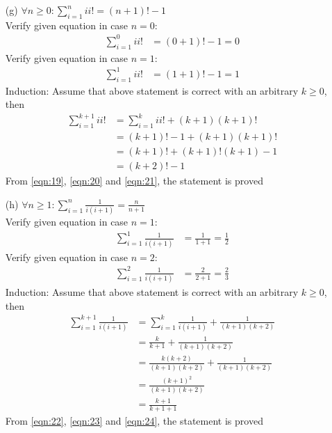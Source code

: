 \begin{enumerate}
    \newpage
    \item[(g)] $\forall n\geq 0: \displaystyle\sum^{n}_{i=1} ii! = (n+1)!-1$ \\
        Verify given equation in case $n=0$:
            \begin{align}
                \displaystyle\sum^{0}_{i=1} ii! &= (0+1)!-1 = 0 \label{eqn:19}
            \end{align}
        Verify given equation in case $n=1$:
            \begin{align}
                \displaystyle\sum^{1}_{i=1} ii! &= (1+1)!-1 = 1 \label{eqn:20}
            \end{align}
        Induction: Assume that above statement is correct with an arbitrary $k \geq 0$, then\\
        \begin{align}
            \displaystyle\sum^{k+1}_{i=1} ii! &= \displaystyle\sum^{k}_{i=1} ii! + (k+1)(k+1)! \\
                                            &= (k+1)!-1 + (k+1)(k+1)! \\
                                            &= (k+1)! + (k+1)!(k+1) -1 \\
                                            &= (k+2)! - 1 \label{eqn:21}
        \end{align}
        From \ref{eqn:19}, \ref{eqn:20} and \ref{eqn:21}, the statement is proved
    
    \item[(h)] $\forall n\geq 1: \displaystyle\sum^{n}_{i=1} \frac{1}{i(i+1)} = \frac{n}{n+1}$ \\
    Verify given equation in case $n=1$:
        \begin{align}
            \displaystyle\sum^{1}_{i=1} \frac{1}{i(i+1)} &= \frac{1}{1+1} = \frac{1}{2} \label{eqn:23}
        \end{align}
    Verify given equation in case $n=2$:
        \begin{align}
            \displaystyle\sum^{2}_{i=1} \frac{1}{i(i+1)} &= \frac{2}{2+1} = \frac{2}{3} \label{eqn:23}
        \end{align}
    Induction: Assume that above statement is correct with an arbitrary $k \geq 0$, then\\
    \begin{align}
        \displaystyle\sum^{k+1}_{i=1} \frac{1}{i(i+1)} &= \displaystyle\sum^{k}_{i=1} \frac{1}{i(i+1)} + \frac{1}{(k+1)(k+2)} \\
                                        &= \frac{k}{k+1} + \frac{1}{(k+1)(k+2)} \\
                                        &= \frac{k(k+2)}{(k+1)(k+2)} + \frac{1}{(k+1)(k+2)} \\
                                        &= \frac{(k+1)^2}{(k+1)(k+2)} \\
                                        &= \frac{k+1}{k+1+1} \label{eqn:24}
    \end{align}
    From \ref{eqn:22}, \ref{eqn:23} and \ref{eqn:24}, the statement is proved
    

\end{enumerate}
